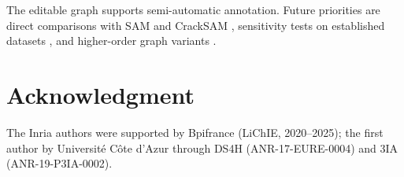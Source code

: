 \documentclass[conference,a4paper]{IEEEtran}
\begin{document}
The editable graph supports semi-automatic annotation. Future priorities are direct comparisons with SAM \cite{Kirillov2023SAM} and CrackSAM \cite{Ge2024CrackSAM}, sensitivity tests on established datasets \cite{shi2016automatic}, and higher-order graph variants \cite{BibiAppliedNetworkScience}.

\section*{Acknowledgment}
The Inria authors were supported by Bpifrance (LiChIE, 2020--2025); the first author by Université Côte d'Azur through DS4H (ANR-17-EURE-0004) and 3IA (ANR-19-P3IA-0002).

\clearpage


\end{document}
